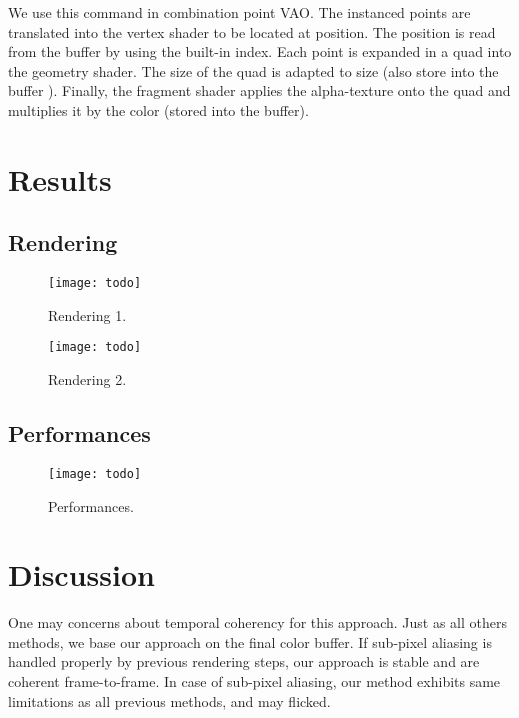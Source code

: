 We use this command in combination point VAO. The instanced points are translated into the vertex shader to be located at \bokeh position. The position is read from the  buffer by using the built-in  index. Each point is expanded in a quad into the geometry shader. The size of the quad is adapted to \bokeh size (also store into the  buffer ). Finally, the fragment shader applies the \bokeh alpha-texture onto the quad and multiplies it by the \bokeh color (stored into the  buffer).

\section{Results}

\subsection{Rendering}
	\begin{figure}[htb]\centering
	\texttt{[image: todo]}
	\caption{Rendering 1.}
	\label{YourName:fig1}
	\end{figure}

	\begin{figure}[htb]\centering
	\texttt{[image: todo]}
	\caption{Rendering 2.}
	\label{YourName:fig1}
	\end{figure}

\subsection{Performances}
	\begin{figure}[htb]\centering
	\texttt{[image: todo]}
	\caption{Performances.}
	\label{YourName:fig1}
	\end{figure}

\section{Discussion}
One may concerns about temporal coherency for this approach. Just as all others methods, we base our approach on the final color buffer. If sub-pixel aliasing is handled properly by previous rendering steps, our approach is stable and \bokehs are coherent frame-to-frame. In case of sub-pixel aliasing, our method exhibits same limitations as all previous methods, and \bokehs may flicked.

